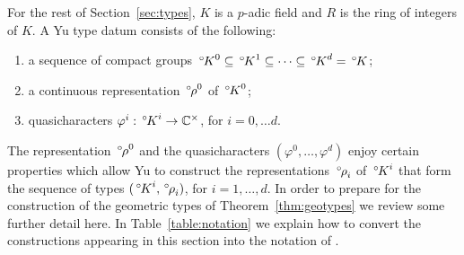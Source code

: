 \documentclass[10pt]{amsart}
\makeatletter
\theoremstyle{plain}
\theoremstyle{definition}
\newcommand{\CC}{{\mathbb{C}}}
\newcommand{\labitem}[2]{
\def\@itemlabel{\textbf{#1}}
\item
\def\@currentlabel{#1}\label{#2}}
\newcommand{\oK}{{\,^\circ \hskip-1pt K}}
\newcommand{\orho}{{\,^\circ \hskip-1pt \rho}}
\makeatother
\begin{document}
For the rest of Section~\ref{sec:types}, $K$ is a $p$-adic field and $R$ is the ring of integers of $K$.
A Yu type datum consists of the following:
\begin{enumerate}
\labitem{Y0}{Y0} a sequence of compact groups $\oK^0 \subseteq \oK^1 \subseteq \cdots \subseteq \oK^d = \oK$;
\labitem{Y1}{Y1} a continuous representation $\orho^0$ of $\oK^0$;
\labitem{Y2}{Y2} quasicharacters $\varphi^i : \oK^i \to \CC^\times$, for $i=0, \ldots d$.
\end{enumerate}
The representation $\orho^0$ and the quasicharacters $(\varphi^0, \ldots , \varphi^d)$ enjoy certain properties which allow Yu to construct the representations $\orho_i$ of $\oK^i$ that form the sequence of types $(\oK^i,\orho_i)$, for $i=1, \ldots, d$.
%
In order to prepare for the construction of the geometric types of Theorem~\ref{thm:geotypes}  we review some further detail here.
In Table~\ref{table:notation} we explain how to convert the constructions appearing in this section into the notation of \cite{yu:01a}.
\end{document}
